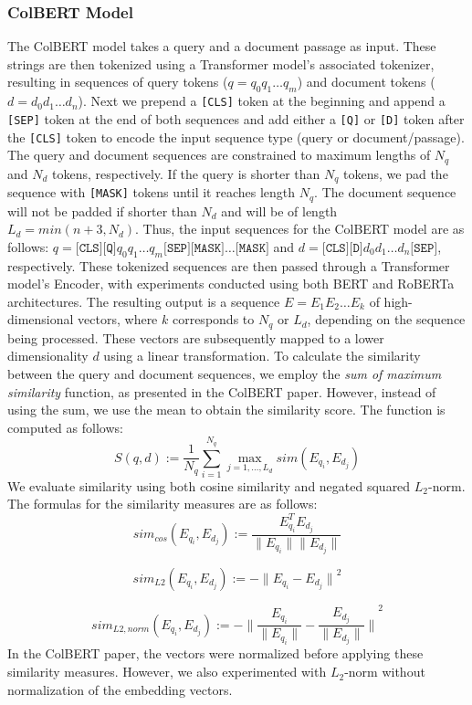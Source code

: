 \documentclass{article}
\begin{document}
\subsubsection{ColBERT Model}
The ColBERT model takes a query and a document passage as input. These strings are then tokenized using a Transformer model's associated tokenizer, resulting in sequences of query tokens ($q = q_0q_1\dots q_m$) and document tokens ($d = d_0d_1\dots d_n$). Next we prepend a \texttt{[CLS]} token at the beginning and append a \texttt{[SEP]} token at the end of both sequences and add either a \texttt{[Q]} or \texttt{[D]} token after the \texttt{[CLS]} token to encode the input sequence type (query or document/passage). The query and document sequences are constrained to maximum lengths of $N_q$ and $N_d$ tokens, respectively. If the query is shorter than $N_q$ tokens, we pad the sequence with \texttt{[MASK]} tokens until it reaches length $N_q$. The document sequence will not be padded if shorter than $N_d$ and will be of length $L_d = min(n + 3, N_d)$. Thus, the input sequences for the ColBERT model are as follows: $q = \texttt{[CLS]}\texttt{[Q]}q_0q_1 \dots q_m\texttt{[SEP]}\texttt{[MASK]}\dots\texttt{[MASK]}$ and $d = \texttt{[CLS]}\texttt{[D]}d_0d_1 \dots d_{n}\texttt{[SEP]}$, respectively. These tokenized sequences are then passed through a Transformer model's Encoder, with experiments conducted using both BERT \cite{devlin2019bert} and RoBERTa \cite{liu2019roberta} architectures. The resulting output is a sequence $E = E_1E_2 \dots E_k$ of high-dimensional vectors, where $k$ corresponds to $N_q$ or $L_d$, depending on the sequence being processed. These vectors are subsequently mapped to a lower dimensionality $d$ using a linear transformation. To calculate the similarity between the query and document sequences, we employ the \textit{sum of maximum similarity} function, as presented in the ColBERT paper. However, instead of using the sum, we use the mean to obtain the similarity score. The function is computed as follows:
$$ S(q,d) := \frac{1}{N_q} \sum_{i=1}^{N_q} \max_{j = 1, \dots, L_d} sim(E_{q_i}, E_{d_j})
$$
We evaluate similarity using both cosine similarity and negated squared $L_2$-norm. The formulas for the similarity measures are as follows:
$$
sim_{cos}(E_{q_i}, E_{d_j}) := \frac{E_{q_i}^{T}E_{d_j} }{\| E_{q_i} \|\| E_{d_j} \|} 
$$

$$
sim_{L2}(E_{q_i}, E_{d_j}) := -{\| E_{q_i} -E_{d_j} \|}^2
$$

$$
sim_{L2,norm}(E_{q_i}, E_{d_j}) := -{\| \frac{E_{q_i}}{\| E_{q_i} \|}  - \frac{E_{d_j}}{\| E_{d_j} \|} \|}^2
$$
In the ColBERT paper, the vectors were normalized before applying these similarity measures. However, we also experimented with $L_2$-norm without normalization of the embedding vectors.
\end{document}
